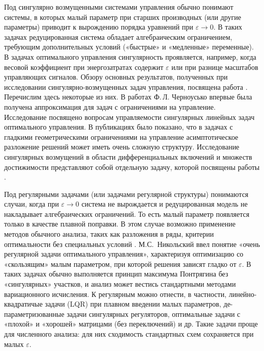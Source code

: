 \documentclass[../main.tex]{subfiles}
\begin{document}
Под сингулярно возмущенными системами управления обычно понимают системы, в которых малый параметр при старших производных (или другие параметры) приводит к вырождению порядка уравнений при $\varepsilon\to0$. 
В таких задачах редуцированная система обладает алгебраическим ограничением, требующим дополнительных условий («быстрые» и «медленные» переменные). 
В задачах оптимального управления сингулярность проявляется, например, когда весовой коэффициент при энергозатратах содержит $\varepsilon$ или при разнице масштабов управляющих сигналов. 
Обзору основных результатов, полученных при исследовании сингулярно-возмущенных задач управления, посвящена работа \cite{Dmitriev}.
Перечислим здесь некоторые из них. 
В работах Ф.\,Л. Черноусько \cite{Chernousko1968, Chernousko1977} впервые была получена аппроксимация для задач с ограничениями на управление.
Исследование \cite{Kokotovic} посвящено вопросам управляемости сингулярных линейных задач оптимального управления.
В публикациях \cite{Ilyin1989, Ilyin1998} было показано, что в задачах с гладкими геометрическими ограничениями на управление  асимптотическое разложение решений может иметь очень сложную структуру. 
Исследование сингулярных возмущений в области дифференциальных включений и множеств достижимости представляют собой отдельную задачу, которой посвящены работы \cite{FilippovaKurzhansky, Veliov, GONCHAROVAOVSEEVICH}.

Под регулярными задачами (или задачами регулярной структуры) понимаются случаи, когда при $\varepsilon\to0$ система не вырождается и редуцированная модель не накладывает алгебраических ограничений. 
То есть малый параметр появляется только в качестве плавной поправки. 
В этом случае возможно применение методов обычного анализа, таких как разложения в ряды, критерии оптимальности без специальных условий \cite{Haratishvili}. 
М.С. Никольский \cite{Nikolski} ввел понятие «очень регулярной задачи оптимального управления», характеризуя оптимизацию со «скользящим» малым параметром, при которой решения зависят гладко от $\varepsilon$. 
В таких задачах обычно выполняется принцип максимума Понтрягина без «сингулярных» участков, и анализ может вестись стандартными методами вариационного исчисления. 
К регулярным можно отнести, в частности, линейно-квадратичые задачи (LQR) при плавном введении малых параметров, де-параметризованные задачи сингулярных регуляторов, оптимальные задачи с «плохой» и «хорошей» матрицами (без переключений) и др. 
Такие задачи проще для численного анализа: для них сходимость стандартных схем сохраняется при малых $\varepsilon$.
\end{document}
